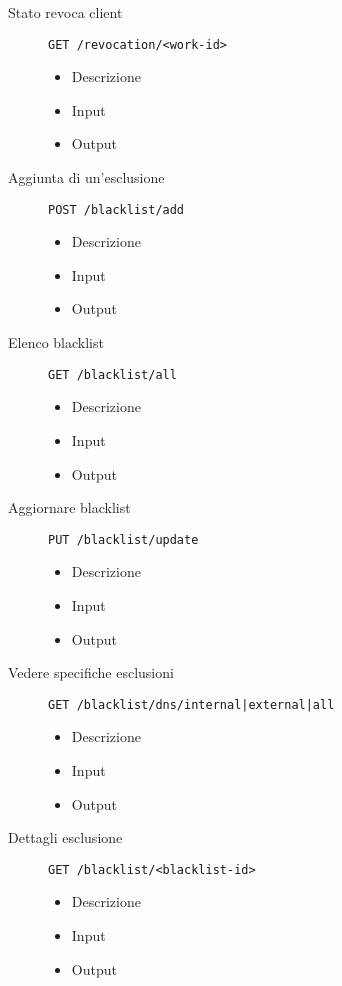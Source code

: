 \begin{description}
    \item[Stato revoca client]\texttt{GET /revocation/<work-id>}
    \begin{itemize}
        \item Descrizione
        \item Input
        \item Output
    \end{itemize}

    \item[Aggiunta di un'esclusione]\texttt{POST /blacklist/add}
    \begin{itemize}
        \item Descrizione
        \item Input
        \item Output
    \end{itemize}

    \item[Elenco blacklist]\texttt{GET /blacklist/all}
    \begin{itemize}
        \item Descrizione
        \item Input
        \item Output
    \end{itemize}

    \item[Aggiornare blacklist]\texttt{PUT /blacklist/update}
    \begin{itemize}
        \item Descrizione
        \item Input
        \item Output
    \end{itemize}

    \item[Vedere specifiche esclusioni]\texttt{GET /blacklist/dns/internal|external|all}
    \begin{itemize}
        \item Descrizione
        \item Input
        \item Output
    \end{itemize}

    \item[Dettagli esclusione]\texttt{GET /blacklist/<blacklist-id>}
    \begin{itemize}
        \item Descrizione
        \item Input
        \item Output
    \end{itemize}


\end{description}
